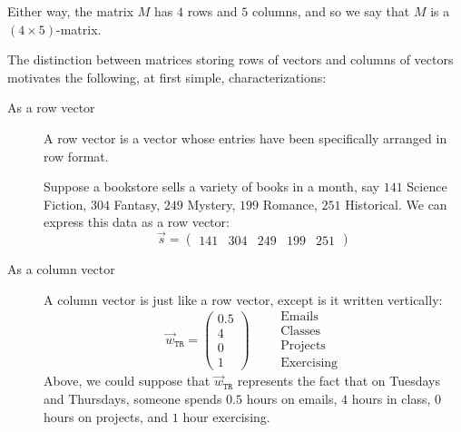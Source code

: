 \documentclass{ximera}
\begin{document}
\begin{remark}
\begin{example}
\end{example}

Either way, the matrix $M$ has $4$ rows and $5$ columns, and so we say that $M$ is a $(4\times 5)$-matrix.

\end{remark}

\begin{exploration}

    The distinction between matrices storing rows of vectors and columns of vectors motivates the following, at first simple, characterizations:

    \begin{description}
        \item[As a row vector] A row vector is a vector whose entries have been specifically arranged in row format.
        
        Suppose a bookstore sells a variety of books in a month, say
          $141$ Science Fiction,
          $304$ Fantasy,
          $249$ Mystery,
          $199$ Romance,
          $251$ Historical.
          We can express this data as a row vector:
          \[
          \vec{s} = \begin{pmatrix}141 & 304 & 249 & 199 & 251 \end{pmatrix}
          \]
        \item[As a column vector] A column vector is just like a row vector,
          except is it written vertically:
          \[
          \vec{w}_{\texttt{TR}} = \begin{pmatrix}
            0.5\\ 4 \\ 0 \\ 1\end{pmatrix}
            \qquad
            \begin{array}{l}
            \text{Emails}\\
            \text{Classes}\\
            \text{Projects}\\
            \text{Exercising}
          \end{array}
          \]
          Above, we could suppose that $\vec{w}_{\texttt{TR}}$ represents the
          fact that on Tuesdays and Thursdays, someone spends $0.5$ hours on
          emails, $4$ hours in class, $0$ hours on projects, and $1$ hour
          exercising.
        \end{description}
        

\end{exploration}
\end{document}
